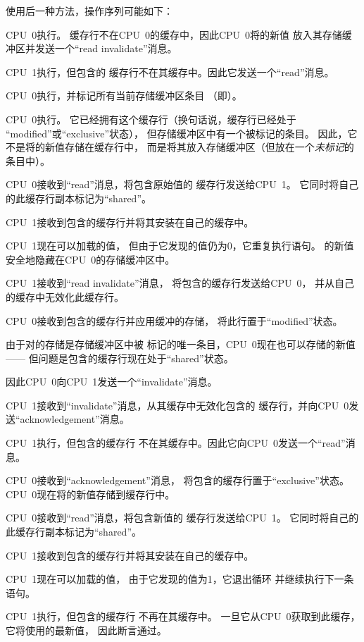 使用后一种方法，操作序列可能如下：
\begin{sequence}
\item	CPU~0执行。
	缓存行不在CPU~0的缓存中，因此CPU~0将的新值
	放入其存储缓冲区并发送一个``read invalidate''消息。
\item	CPU~1执行，但包含的
	缓存行不在其缓存中。因此它发送一个``read''消息。
\item	CPU~0执行，并标记所有当前存储缓冲区条目
	（即）。
\item	CPU~0执行。
	它已经拥有这个缓存行（换句话说，缓存行已经处于
	``modified''或``exclusive''状态），
	但存储缓冲区中有一个被标记的条目。
	因此，它不是将的新值存储在缓存行中，
	而是将其放入存储缓冲区（但放在一个\emph{未标记}的条目中）。
\item	CPU~0接收到``read''消息，将包含原始值的
	缓存行发送给CPU~1。
	它同时将自己的此缓存行副本标记为``shared''。
\item	CPU~1接收到包含的缓存行并将其安装在自己的缓存中。
\item	CPU~1现在可以加载的值，
	但由于它发现的值仍为0，它重复执行语句。
	的新值安全地隐藏在CPU~0的存储缓冲区中。
\item	CPU~1接收到``read invalidate''消息，
	将包含的缓存行发送给CPU~0，
	并从自己的缓存中无效化此缓存行。
\item	CPU~0接收到包含的缓存行并应用缓冲的存储，
	将此行置于``modified''状态。
\item	由于对的存储是存储缓冲区中被
	标记的唯一条目，CPU~0现在也可以存储的新值——
	但问题是包含的缓存行现在处于``shared''状态。
\item	因此CPU~0向CPU~1发送一个``invalidate''消息。
\item	CPU~1接收到``invalidate''消息，从其缓存中无效化包含的
	缓存行，并向CPU~0发送``acknowledgement''消息。
\item	CPU~1执行，但包含的缓存行
	不在其缓存中。因此它向CPU~0发送一个``read''消息。
\item	CPU~0接收到``acknowledgement''消息，
	将包含的缓存行置于``exclusive''状态。
	CPU~0现在将的新值存储到缓存行中。
\item	CPU~0接收到``read''消息，将包含新值的
	缓存行发送给CPU~1。
	它同时将自己的此缓存行副本标记为``shared''。%
	\label{seq:app:whymb:Store buffers: All copies shared}
\item	CPU~1接收到包含的缓存行并将其安装在自己的缓存中。
\item	CPU~1现在可以加载的值，
	由于它发现的值为1，它退出循环
	并继续执行下一条语句。
\item	CPU~1执行，但包含的缓存行
	不再在其缓存中。
	一旦它从CPU~0获取到此缓存，它将使用的最新值，
	因此断言通过。
\end{sequence}

